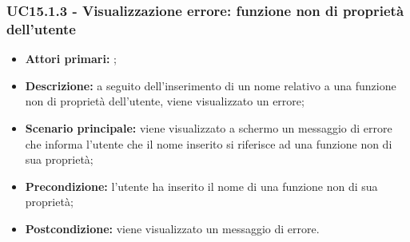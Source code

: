 \subsubsection{UC15.1.3 - Visualizzazione errore: funzione non di proprietà dell’utente}
\begin{itemize}
	\item \textbf{Attori primari:} \us{};
	\item \textbf{Descrizione:} a seguito dell’inserimento di un nome relativo a una funzione non di proprietà dell’utente, viene visualizzato un errore;
	\item \textbf{Scenario principale:} viene visualizzato a schermo un messaggio di errore che informa l’utente che il nome inserito si riferisce ad una funzione non di sua proprietà;
	\item \textbf{Precondizione:} l’utente ha inserito il nome di una funzione non di sua proprietà; 
	\item \textbf{Postcondizione:} viene visualizzato un messaggio di errore. 
\end{itemize}
